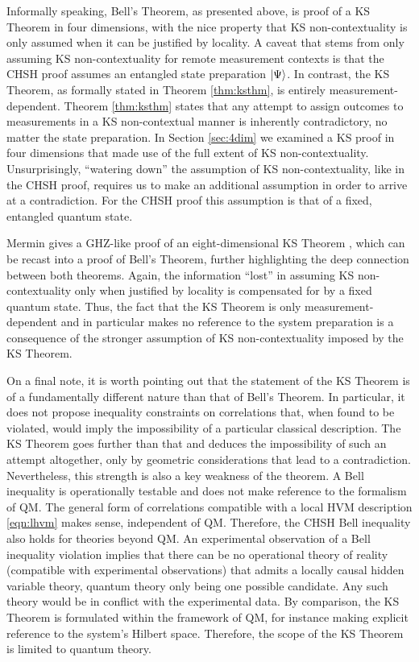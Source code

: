 Informally speaking, Bell's Theorem, as presented above, is proof of a KS Theorem in four dimensions, with the nice property that KS non-contextuality is only assumed when it can be justified by locality. A caveat that stems from only assuming KS non-contextuality for remote measurement contexts is that the CHSH proof assumes an entangled state preparation $\ket{\Psi}$. In contrast, the KS Theorem, as formally stated in Theorem \ref{thm:ksthm}, is entirely measurement-dependent. Theorem \ref{thm:ksthm} states that any attempt to assign outcomes to measurements in a KS non-contextual manner is inherently contradictory, no matter the state preparation. In Section \ref{sec:4dim} we examined a KS proof in four dimensions that made use of the full extent of KS non-contextuality. Unsurprisingly, “watering down” the assumption of KS non-contextuality, like in the CHSH proof, requires us to make an additional assumption in order to arrive at a contradiction. For the CHSH proof this assumption is that of a fixed, entangled quantum state. 

Mermin gives a GHZ-like proof of an eight-dimensional KS Theorem \cite{Mermin1993}, which can be recast into a proof of Bell's Theorem, further highlighting the deep connection between both theorems. Again, the information “lost” in assuming KS non-contextuality only when justified by locality is compensated for by a fixed quantum state. Thus, the fact that the KS Theorem is only measurement-dependent and in particular makes no reference to the system preparation is a consequence of the stronger assumption of KS non-contextuality imposed by the KS Theorem.

On a final note, it is worth pointing out that the statement of the KS Theorem is of a fundamentally different nature than that of Bell's Theorem. In particular, it does not propose inequality constraints on correlations that, when found to be violated, would imply the impossibility of a particular classical description. The KS Theorem goes further than that and deduces the impossibility of such an attempt altogether, only by geometric considerations that lead to a contradiction. Nevertheless, this strength is also a key weakness of the theorem. A Bell inequality is operationally testable and does not make reference to the formalism of QM. The general form of correlations compatible with a local HVM description \ref{eqn:lhvm} makes sense, independent of QM. Therefore, the CHSH Bell inequality also holds for theories beyond QM. An experimental observation of a Bell inequality violation implies that there can be no operational theory of reality (compatible with experimental observations) that admits a locally causal hidden variable theory, quantum theory only being one possible candidate. Any such theory would be in conflict with the experimental data. By comparison, the KS Theorem is formulated within the framework of QM, for instance making explicit reference to the system's Hilbert space. Therefore, the scope of the KS Theorem is limited to quantum theory. 

